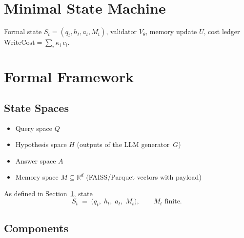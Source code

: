 \documentclass[11pt]{article}
\newcommand{\WriteCost}{\mathrm{WriteCost}}
\begin{document}
\section{Minimal State Machine}
\label{sec:minimal-state-machine}
Formal state $S_t=(q_t,h_t,a_t,M_t)$, validator $V_\theta$, memory update
$U$, cost ledger $\WriteCost = \sum_i \kappa_i\,c_i$.

\section{Formal Framework}
\label{sec:framework}

\subsection{State Spaces}
\label{sec:state-spaces}

\begin{itemize}\setlength\itemsep{2pt}
  \item Query space $Q$
  \item Hypothesis space $H$ (outputs of the LLM generator~$G$)
  \item Answer space $A$
  \item Memory space $M\subseteq\mathbb R^{d}$ (FAISS/Parquet vectors with payload)
\end{itemize}

As defined in Section~\ref{sec:minimal-state-machine}, state
\[
  S_t \;=\; \bigl(q_t,\; h_t,\; a_t,\; M_t \bigr), \qquad M_t\text{ finite}.
\]

\subsection{Components}
\label{sec:components}
\end{document}
